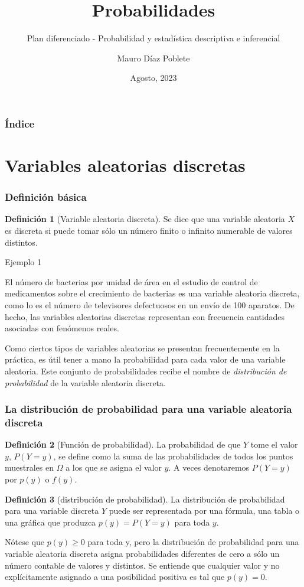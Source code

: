 \documentclass[10pt]{beamer}
\title[Distribuciones de probabilidad]{Probabilidades}
\subtitle[Probabilidad y estadística]{Plan diferenciado - Probabilidad y estadística descriptiva e inferencial}
\author[Mauro Díaz]{Mauro Díaz Poblete}
\date{Agosto, 2023}
\institute[Manquemávida]{Departamento de matemática \\ Colegio Manquemávida}
\theoremstyle{plain} %
\theoremstyle{definition}
\newtheorem{defn}{Definición}
\theoremstyle{remark}
\newcommand{\dfn}[2]{
\begin{defn}[#1]
\justifying
#2
\end{defn}
}
\newcommand{\ejem}[2]{
\begin{exampleblock}{Ejemplo #1}
\justifying
#2
\end{exampleblock}
}
\begin{document}
\begin{frame}

\maketitle
\end{frame}


\begin{frame}
\frametitle{Índice}
\tableofcontents
\end{frame}



\section{Variables aleatorias discretas}

\begin{frame}
\justifying
\frametitle{Definición básica}

\dfn{Variable aleatoria discreta}{
Se dice que una variable aleatoria $X$ es discreta si puede tomar sólo un número finito o infinito numerable de valores distintos. 
}
\pause
\ejem{1}{
El número de bacterias por unidad de área en el estudio de control de medicamentos sobre el crecimiento de bacterias es una variable aleatoria
discreta, como lo es el número de televisores defectuosos en un envío de 100 aparatos. De hecho, las variables aleatorias discretas representan con frecuencia cantidades asociadas con
fenómenos reales.
}
Como ciertos tipos de variables aleatorias se presentan frecuentemente en la práctica, es útil tener a mano la probabilidad para cada valor de una variable aleatoria. Este conjunto de probabilidades recibe el nombre de \textit{distribución de probabilidad} de la variable aleatoria discreta.
\end{frame}

\begin{frame}
\justifying
\frametitle{La distribución de probabilidad para una variable aleatoria discreta}
\dfn{Función de probabilidad}{
La probabilidad de que $Y$ tome el valor $y$, $P(Y = y)$, se define como la suma de las probabilidades de todos los puntos muestrales en $\Omega$ a los que se asigna el valor $y$. A veces denotaremos $P(Y = y)$ por $p(y)$ o $f(y)$.
}
\pause
\dfn{distribución de probabilidad}{
La distribución de probabilidad para una variable discreta $Y$ puede ser representada por una fórmula, una tabla o una gráfica que produzca $p(y) = P(Y = y)$ para toda $y$.
}
\pause
Nótese que $p(y) \geq 0$ para toda y, pero la distribución de probabilidad para una variable 
aleatoria discreta asigna probabilidades diferentes de cero a sólo un número contable de valores y distintos. 
Se entiende que cualquier valor y no explícitamente asignado a una posibilidad positiva es tal que $p(y) = 0$.
\end{frame}
\end{document}
